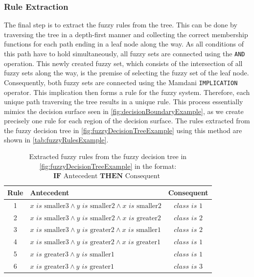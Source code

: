 \subsubsection{Rule Extraction}

The final step is to extract the fuzzy rules from the tree. This can be done by traversing the tree in a depth-first manner and collecting the correct membership functions for each path ending in a leaf node along the way. As all conditions of this path have to hold simultaneously, all fuzzy sets are connected using the \texttt{AND} operation. This newly created fuzzy set, which consists of the intersection of all fuzzy sets along the way, is the premise of selecting the fuzzy set of the leaf node. Consequently, both fuzzy sets are connected using the Mamdani \texttt{IMPLICATION} operator. This implication then forms a rule for the fuzzy system. Therefore, each unique path traversing the tree results in a unique rule. This process essentially mimics the decision surface seen in \autoref{fig:decisionBoundaryExample}, as we create precisely one rule for each region of the decision surface. The rules extracted from the fuzzy decision tree in \autoref{fig:fuzzyDecisionTreeExample} using this method are shown in \autoref{tab:fuzzyRulesExample}.


\newpage
\newcommand{\is}{\textit{ is }}


\begin{table}[H]
    \centering
    \begin{tabular}{c|l|c}
        \textbf{Rule} & \textbf{Antecedent}                                                             & \textbf{Consequent} \\
        \hline
        1             & $x \is \text{smaller3} \land y \is \text{smaller2} \land x \is \text{smaller2}$ & $class \is 1$       \\
        2             & $x \is \text{smaller3} \land y \is \text{smaller2} \land x \is \text{greater2}$ & $class \is 2$       \\
        3             & $x \is \text{smaller3} \land y \is \text{greater2} \land x \is \text{smaller1}$ & $class \is 2$       \\
        4             & $x \is \text{smaller3} \land y \is \text{greater2} \land x \is \text{greater1}$ & $class \is 1$       \\
        5             & $x \is \text{greater3} \land y \is \text{smaller1}$                             & $class \is 1$       \\
        6             & $x \is \text{greater3} \land y \is \text{greater1}$                             & $class \is 3$       \\
    \end{tabular}
    \caption[Extracted fuzzy rules from the fuzzy decision tree]{Extracted fuzzy rules from the fuzzy decision tree in \autoref{fig:fuzzyDecisionTreeExample} in the format: $\textbf{IF} \text{ Antecedent } \textbf{THEN} \text{ Consequent }$}
    \label{tab:fuzzyRulesExample}
\end{table}

